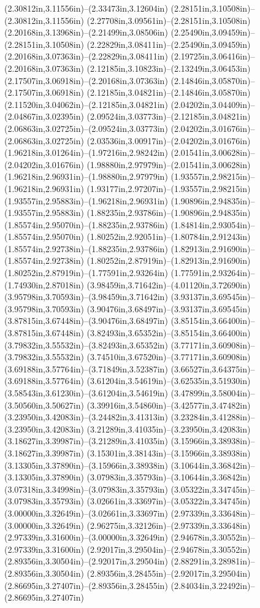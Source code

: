 (2.30812in,3.11556in)--(2.33473in,3.12604in) (2.28151in,3.10508in)--(2.30812in,3.11556in) (2.27708in,3.09561in)--(2.28151in,3.10508in) (2.20168in,3.13968in)--(2.21499in,3.08506in) (2.25490in,3.09459in)--(2.28151in,3.10508in) (2.22829in,3.08411in)--(2.25490in,3.09459in) (2.20168in,3.07363in)--(2.22829in,3.08411in) (2.19725in,3.06416in)--(2.20168in,3.07363in) (2.12185in,3.10823in)--(2.13249in,3.06453in) (2.17507in,3.06918in)--(2.20168in,3.07363in) (2.14846in,3.05870in)--(2.17507in,3.06918in) (2.12185in,3.04821in)--(2.14846in,3.05870in) (2.11520in,3.04062in)--(2.12185in,3.04821in) (2.04202in,3.04409in)--(2.04867in,3.02395in) (2.09524in,3.03773in)--(2.12185in,3.04821in) (2.06863in,3.02725in)--(2.09524in,3.03773in) (2.04202in,3.01676in)--(2.06863in,3.02725in) (2.03536in,3.00917in)--(2.04202in,3.01676in) (1.96218in,3.01264in)--(1.97216in,2.98242in) (2.01541in,3.00628in)--(2.04202in,3.01676in) (1.98880in,2.97979in)--(2.01541in,3.00628in) (1.96218in,2.96931in)--(1.98880in,2.97979in) (1.93557in,2.98215in)--(1.96218in,2.96931in) (1.93177in,2.97207in)--(1.93557in,2.98215in) (1.93557in,2.95883in)--(1.96218in,2.96931in) (1.90896in,2.94835in)--(1.93557in,2.95883in) (1.88235in,2.93786in)--(1.90896in,2.94835in) (1.85574in,2.95070in)--(1.88235in,2.93786in) (1.84814in,2.93054in)--(1.85574in,2.95070in) (1.80252in,2.92051in)--(1.80784in,2.91243in) (1.85574in,2.92738in)--(1.88235in,2.93786in) (1.82913in,2.91690in)--(1.85574in,2.92738in) (1.80252in,2.87919in)--(1.82913in,2.91690in) (1.80252in,2.87919in)--(1.77591in,2.93264in) (1.77591in,2.93264in)--(1.74930in,2.87018in) (3.98459in,3.71642in)--(4.01120in,3.72690in) (3.95798in,3.70593in)--(3.98459in,3.71642in) (3.93137in,3.69545in)--(3.95798in,3.70593in) (3.90476in,3.68497in)--(3.93137in,3.69545in) (3.87815in,3.67448in)--(3.90476in,3.68497in) (3.85154in,3.66400in)--(3.87815in,3.67448in) (3.82493in,3.65352in)--(3.85154in,3.66400in) (3.79832in,3.55532in)--(3.82493in,3.65352in) (3.77171in,3.60908in)--(3.79832in,3.55532in) (3.74510in,3.67520in)--(3.77171in,3.60908in) (3.69188in,3.57764in)--(3.71849in,3.52387in) (3.66527in,3.64375in)--(3.69188in,3.57764in) (3.61204in,3.54619in)--(3.62535in,3.51930in) (3.58543in,3.61230in)--(3.61204in,3.54619in) (3.47899in,3.58004in)--(3.50560in,3.50627in) (3.39916in,3.54860in)--(3.42577in,3.47482in) (3.23950in,3.42083in)--(3.24482in,3.41313in) (3.23284in,3.41288in)--(3.23950in,3.42083in) (3.21289in,3.41035in)--(3.23950in,3.42083in) (3.18627in,3.39987in)--(3.21289in,3.41035in) (3.15966in,3.38938in)--(3.18627in,3.39987in) (3.15301in,3.38143in)--(3.15966in,3.38938in) (3.13305in,3.37890in)--(3.15966in,3.38938in) (3.10644in,3.36842in)--(3.13305in,3.37890in) (3.07983in,3.35793in)--(3.10644in,3.36842in) (3.07318in,3.34998in)--(3.07983in,3.35793in) (3.05322in,3.34745in)--(3.07983in,3.35793in) (3.02661in,3.33697in)--(3.05322in,3.34745in) (3.00000in,3.32649in)--(3.02661in,3.33697in) (2.97339in,3.33648in)--(3.00000in,3.32649in) (2.96275in,3.32126in)--(2.97339in,3.33648in) (2.97339in,3.31600in)--(3.00000in,3.32649in) (2.94678in,3.30552in)--(2.97339in,3.31600in) (2.92017in,3.29504in)--(2.94678in,3.30552in) (2.89356in,3.30504in)--(2.92017in,3.29504in) (2.88291in,3.28981in)--(2.89356in,3.30504in) (2.89356in,3.28455in)--(2.92017in,3.29504in) (2.86695in,3.27407in)--(2.89356in,3.28455in) (2.84034in,3.22492in)--(2.86695in,3.27407in) 